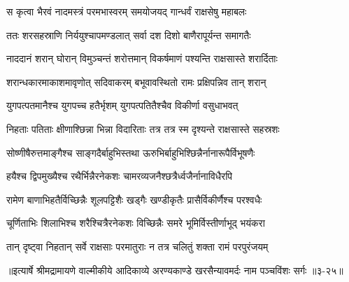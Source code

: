 \twolineshloka
{स कृत्वा भैरवं नादमस्त्रं परमभास्वरम्}
{समयोजयद् गान्धर्वं राक्षसेषु महाबलः} %

\twolineshloka
{ततः शरसहस्राणि निर्ययुश्चापमण्डलात्}
{सर्वा दश दिशो बाणैरापूर्यन्त समागतैः} %

\twolineshloka
{नाददानं शरान् घोरान् विमुञ्चन्तं शरोत्तमान्}
{विकर्षमाणं पश्यन्ति राक्षसास्ते शरार्दिताः} %

\twolineshloka
{शरान्धकारमाकाशमावृणोत् सदिवाकरम्}
{बभूवावस्थितो रामः प्रक्षिपन्निव तान् शरान्} %

\twolineshloka
{युगपत्पतमानैश्च युगपच्च हतैर्भृशम्}
{युगपत्पतितैश्चैव विकीर्णा वसुधाभवत्} %

\twolineshloka
{निहताः पतिताः क्षीणाश्छिन्ना भिन्ना विदारिताः}
{तत्र तत्र स्म दृश्यन्ते राक्षसास्ते सहस्रशः} %

\twolineshloka
{सोष्णीषैरुत्तमाङ्गैश्च साङ्गदैर्बाहुभिस्तथा}
{ऊरुभिर्बाहुभिश्छिन्नैर्नानारूपैर्विभूषणैः} %

\twolineshloka
{हयैश्च द्विपमुख्यैश्च रथैर्भिन्नैरनेकशः}
{चामरव्यजनैश्छत्रैर्ध्वजैर्नानाविधैरपि} %

\twolineshloka
{रामेण बाणाभिहतैर्विच्छिन्नैः शूलपट्टिशैः}
{खड्गैः खण्डीकृतैः प्रासैर्विकीर्णैश्च परश्वधैः} %

\twolineshloka
{चूर्णिताभिः शिलाभिश्च शरैश्चित्रैरनेकशः}
{विच्छिन्नैः समरे भूमिर्विस्तीर्णाभूद् भयंकरा} %

\twolineshloka
{तान् दृष्ट्वा निहतान् सर्वे राक्षसाः परमातुराः}
{न तत्र चलितुं शक्ता रामं परपुरंजयम्} %


॥इत्यार्षे श्रीमद्रामायणे वाल्मीकीये आदिकाव्ये अरण्यकाण्डे खरसैन्यावमर्दः नाम पञ्चविंशः सर्गः ॥३-२५॥
